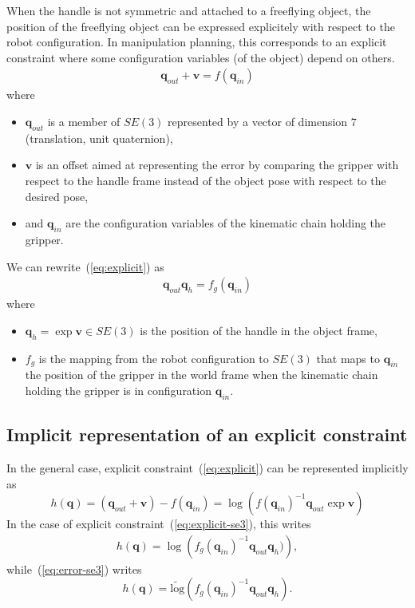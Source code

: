 \documentclass {article}
\newcommand\conf{\mathbf{q}}
\newcommand\pseudolog{\widetilde{\mbox{log}}}
\begin{document}
When the handle is not symmetric and attached to a freeflying object, the position of the freeflying object can be expressed explicitely with respect to the robot configuration. In manipulation planning, this corresponds to an explicit constraint where some configuration variables (of the object) depend on others.
\begin {eqnarray}\label{eq:explicit}
  \conf_{out} + \mathbf{v} = f (\conf_{in})
\end {eqnarray}
where
\begin{itemize}
  \item $\conf_{out}$ is a member of $SE(3)$ represented by a vector of
    dimension 7 (translation, unit quaternion),
  \item $\mathbf{v}$ is an offset aimed at representing the error by comparing the gripper with respect to the handle frame instead of the object pose with respect to the desired pose,
  \item and $\conf_{in}$ are the configuration variables of the kinematic chain holding the gripper.
\end {itemize}
We can rewrite~(\ref{eq:explicit}) as
\begin {eqnarray}\label{eq:explicit-se3}
  \conf_{out} \conf_{h} = f_{g} (\conf_{in})
\end {eqnarray}
where
\begin {itemize}
\item $\conf_{h} = \exp \mathbf{v}\in SE(3)$ is the position of the handle in the object frame,
\item $f_{g}$ is the mapping from the robot configuration to $SE(3)$ that maps to $\conf_{in}$ the position of the gripper in the world frame when the kinematic chain holding the gripper is in configuration $\conf_{in}$.
\end{itemize}

\subsection {Implicit representation of an explicit constraint}

In the general case, explicit constraint~(\ref{eq:explicit}) can be represented implicitly as
$$
h (\conf) = (\conf_{out} + \mathbf{v}) - f (\conf_{in}) = \log (f (\conf_{in})^{-1} \conf_{out} \exp \mathbf{v})
$$
In the case of explicit constraint~(\ref{eq:explicit-se3}), this writes
\begin{eqnarray}\label{eq:explicit-se3-2}
h (\conf) = \log \left(f_{g} (\conf_{in})^{-1}\conf_{out}\conf_{h})\right),
\end{eqnarray}
while~(\ref{eq:error-se3}) writes
$$
h (\conf) = \pseudolog \left(f_{g} (\conf_{in})^{-1}\conf_{out}\conf_{h}\right).
$$
\end{document}
